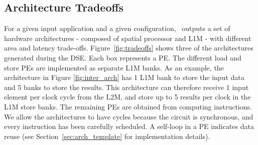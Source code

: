 \subsection{Architecture Tradeoffs}
\label{ssec:arch_tradeoffs}
\vspace{-1mm}
For a given input application and a given configuration, \frameworkname~outputs a set of hardware architectures - composed of spatial processor and L1M - with different area and latency trade-offs. Figure~\ref{fig:tradeoffs} shows three of the architectures generated during the DSE. Each box represents a PE. The different load and store PEs are implemented as separate L1M banks. As an example, the architecture in Figure \ref{fig:inter_arch} has 1 L1M bank to store the input data and 5 banks to store the results. This architecture can therefore receive 1 input element per clock cycle from the L2M, and store up to 5 results per clock in the L1M store banks. The remaining PEs are obtained from computing instructions. We allow the architectures to have cycles because the circuit is synchronous, and every instruction has been carefully scheduled. A self-loop in a PE indicates data reuse (see Section~\ref{sec:arch_template} for implementation details).
